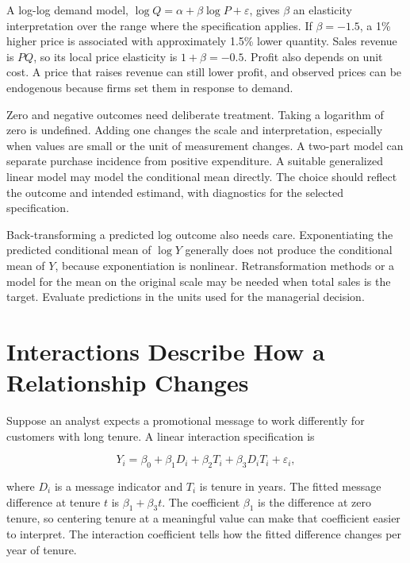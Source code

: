 A log-log demand model, \(\log Q=\alpha+\beta\log P+\varepsilon\), gives
\(\beta\) an elasticity interpretation over the range where the
specification applies. If \(\beta=-1.5\), a 1\% higher price is
associated with approximately 1.5\% lower quantity. Sales revenue is
\(PQ\), so its local price elasticity is \(1+\beta=-0.5\). Profit also
depends on unit cost. A price that raises revenue can still lower
profit, and observed prices can be endogenous because firms set them in
response to demand.

Zero and negative outcomes need deliberate treatment. Taking a logarithm
of zero is undefined. Adding one changes the scale and interpretation,
especially when values are small or the unit of measurement changes. A
two-part model can separate purchase incidence from positive
expenditure. A suitable generalized linear model may model the
conditional mean directly. The choice should reflect the outcome and
intended estimand, with diagnostics for the selected specification.

Back-transforming a predicted log outcome also needs care.
Exponentiating the predicted conditional mean of \(\log Y\) generally
does not produce the conditional mean of \(Y\), because exponentiation
is nonlinear. Retransformation methods or a model for the mean on the
original scale may be needed when total sales is the target. Evaluate
predictions in the units used for the managerial decision.

\hypertarget{M03-interactions-describe-how-a-relationship-changes}{%
\section{Interactions Describe How a Relationship
Changes}\label{M03-interactions-describe-how-a-relationship-changes}}

\noindent Suppose an analyst expects a promotional message to work differently for
customers with long tenure. A linear interaction specification is

\[
Y_i=\beta_0+\beta_1D_i+\beta_2T_i+\beta_3D_iT_i+\varepsilon_i,
\]

where \(D_i\) is a message indicator and \(T_i\) is tenure in years. The
fitted message difference at tenure \(t\) is \(\beta_1+\beta_3t\). The
coefficient \(\beta_1\) is the difference at zero tenure, so centering
tenure at a meaningful value can make that coefficient easier to
interpret. The interaction coefficient tells how the fitted difference
changes per year of tenure.

